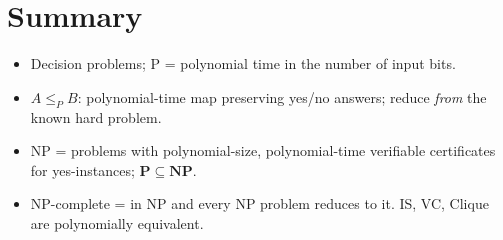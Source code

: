 \section*{Summary}
\begin{itemize}
  \item Decision problems; P = polynomial time in the number of input bits.
  \item $A\le_PB$: polynomial-time map preserving yes/no answers; reduce \emph{from} the known hard problem.
  \item NP = problems with polynomial-size, polynomial-time verifiable certificates for yes-instances; $\mathbf P\subseteq\mathbf{NP}$.
  \item NP-complete = in NP and every NP problem reduces to it. IS, VC, Clique are polynomially equivalent.
\end{itemize}
